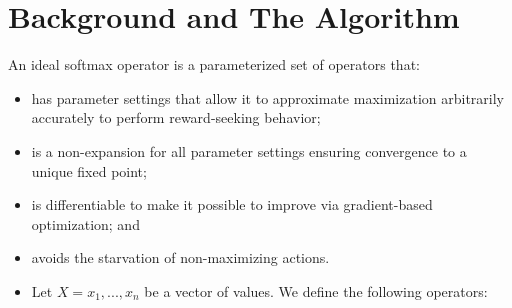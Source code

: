 \section{Background and The Algorithm}
\label{section:algorithm}
An ideal softmax operator is a parameterized set of operators that:
\begin{itemize}
\item has parameter settings that allow it to approximate maximization arbitrarily accurately to perform reward-seeking behavior;
\item is a non-expansion for all parameter settings ensuring convergence to a unique fixed point;
\item is differentiable to make it possible to improve via gradient-based optimization; and
\item avoids the starvation of non-maximizing actions.
\item Let $X = x_{1},...,x_{n}$ be a vector of values. We define the following operators:
\end{itemize}

